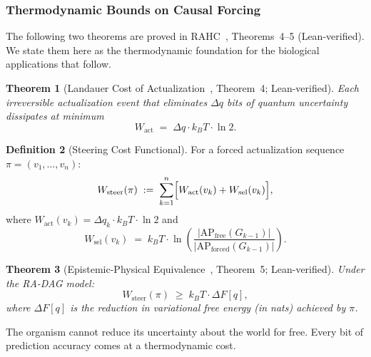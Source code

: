\documentclass[11pt,a4paper]{article}
\theoremstyle{plain}
\newtheorem{theorem}{Theorem}[section]
\theoremstyle{definition}
\newtheorem{definition}[theorem]{Definition}
\theoremstyle{remark}
\newcommand{\AP}{\mathrm{AP}}
\begin{document}
\subsubsection{Thermodynamic Bounds on Causal Forcing}

The following two theorems are proved in RAHC~\citep{Sandeman2026RAHC},
Theorems~4--5 (Lean-verified). We state them here as the thermodynamic foundation
for the biological applications that follow.

\begin{theorem}[Landauer Cost of Actualization~{\normalfont\citep{Sandeman2026RAHC},
Theorem~4; \textup{Lean-verified}}]
\label{thm:landauer}
Each irreversible actualization event that eliminates $\Delta q$ bits of quantum
uncertainty dissipates at minimum
\begin{equation}
  W_{\mathrm{act}} \;=\; \Delta q \cdot k_{B}T \cdot \ln 2.
\end{equation}
\end{theorem}

\begin{definition}[Steering Cost Functional]
For a forced actualization sequence $\pi = (v_{1}, \ldots, v_{n})$:
\begin{equation}
  W_{\mathrm{steer}}(\pi)
  \;:=\;
  \sum_{k=1}^{n}
  \Bigl[W_{\mathrm{act}}(v_{k}) + W_{\mathrm{sel}}(v_{k})\Bigr],
\end{equation}
where $W_{\mathrm{act}}(v_{k}) = \Delta q_{k} \cdot k_{B}T \cdot \ln 2$ and
\begin{equation}
  W_{\mathrm{sel}}(v_{k})
  \;=\;
  k_{B}T \cdot \ln\!\left(
    \frac{|\AP_{\mathrm{free}}(G_{k-1})|}{|\AP_{\mathrm{forced}}(G_{k-1})|}
  \right).
\end{equation}
\end{definition}

\begin{theorem}[Epistemic-Physical Equivalence~{\normalfont\citep{Sandeman2026RAHC},
Theorem~5; \textup{Lean-verified}}]
\label{thm:steering}
Under the RA-DAG model:
\begin{equation}
  W_{\mathrm{steer}}(\pi)
  \;\geq\;
  k_{B}T \cdot \Delta F[q],
\end{equation}
where $\Delta F[q]$ is the reduction in variational free energy (in nats)
achieved by $\pi$.
\end{theorem}

The organism cannot reduce its uncertainty about the world for free. Every bit of
prediction accuracy comes at a thermodynamic cost.
\end{document}
